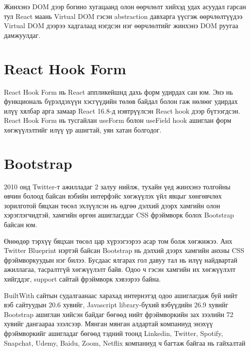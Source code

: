 Жинхэнэ DOM дээр богино хугацаанд олон өөрчлөлт хийхэд удах асуудал гарсан тул React маань Virtual DOM гэсэн abstraction давхарга үүсгэж өөрчлөлтүүдээ Virtual DOM дээрээ хадгалаад нэгдсэн нэг өөрчлөлтийг жинхэнэ DOM руугаа дамжуулдаг.

\section{React Hook Form}
React Hook Form нь React аппликейшнд дахь форм удирдах сан юм. Энэ нь функциональ бүрэлдэхүүн хэсгүүдийн төлөв байдал болон гаж нөлөөг удирдах илүү хялбар арга замаар React 16.8-д нэвтрүүлсэн React hook дээр бүтээгдсэн. React Hook Form нь тусгайлан useForm болон useField hook ашиглан форм хөгжүүлэлтийг илүү үр ашигтай, уян хатан болгодог.

\section{Bootstrap}
2010 онд Twitter-т ажилладаг 2 залуу нийлж, тухайн үед жинхэнэ толгойны өвчин болоод байсан вэбийн интерфэйс хөгжүүлэх үйл явцыг хөнгөвчлөх зорилготой бяцхан төсөл эхлүүлсэн нь өдгөө дэлхий дээрх хамгийн олон хэрэглэгчидтэй, хамгийн өргөн ашиглагддаг CSS фрэймворк болох Bootstrap байсан юм.

Өнөөдөр тэрхүү бяцхан төсөл цар хүрээгээрээ асар том болж хөгжижээ. Анх Twitter Blueprint нэртэй байсан Bootstrap нь дэлхий дээрх хамгийн анхны CSS фрэймворкуудын нэг билээ. Бусдаас ялгарах гол давуу тал нь илүү найдвартай ажиллагаа, тасралтгүй хөгжүүлэлт байв. Одоо ч гэсэн хамгийн их хөгжүүлэлт хийгддэг, support сайтай фрэймворк хэвээрээ байна.

BuiltWith сайтын судалгаанаас харахад интернэтэд одоо ашиглагдаж буй нийт вэб сайтуудын 20.6 хувийг, Javascript library-бүхий вэбүүдийн 26.9 хувийг Bootstrap ашиглан хийсэн байдаг бөгөөд нийт фрэймворкийн зах зээлийн 72 хувийг дангаараа эзэлсээр. Мянган мянган алдартай компаниуд энэхүү фрэймворкийг ашигладаг бөгөөд тэдний тоонд Linkedin, Twitter, Spotify, Snapchat, Udemy, Baidu, Zoom, Netflix компаниуд ч багтаж байгаа нь гайхалтай